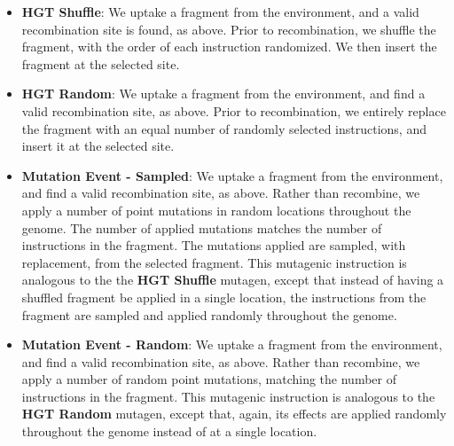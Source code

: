 \documentclass[PhD]{msu-thesis}
\begin{document}
\begin{itemize}
	\item \textbf{HGT Shuffle}: We uptake a fragment from the environment, and a valid recombination site is found, as above.
Prior to recombination, we shuffle the fragment, with the order of each instruction randomized. We then insert the fragment at the selected site.
	\item \textbf{HGT Random}: We uptake a fragment from the environment, and find a valid recombination site, as above. Prior to recombination, we entirely replace the fragment with an equal number of randomly selected instructions, and insert it at the selected site.
	\item \textbf{Mutation Event - Sampled}: We uptake a fragment from the environment, and find a valid recombination site, as above. Rather than recombine, we apply a number of point mutations in random locations throughout the genome. The number of applied mutations matches the number of instructions in the fragment. The mutations applied are sampled, with replacement, from the selected fragment. This mutagenic instruction is analogous to the the \textbf{HGT Shuffle} mutagen, except that instead of having a shuffled fragment be applied in a single location, the instructions from the fragment are sampled and applied randomly throughout the genome.

	\item \textbf{Mutation Event - Random}: We uptake a fragment from the environment, and find a valid recombination site, as above. Rather than recombine, we apply a number of random point mutations, matching the number of instructions in the fragment. This mutagenic instruction is analogous to the \textbf{HGT Random} mutagen, except that, again, its effects are applied randomly throughout the genome instead of at a single location.


\end{itemize}
\end{document}
